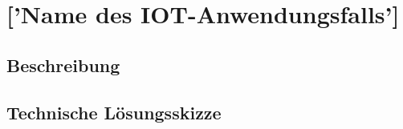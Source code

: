 \chapter{['Name des IOT-Anwendungsfalls']}
\label{ch:iot_usecase}
\lipsum[1-1]

%
%
\section{Beschreibung}
\label{sec:iot_usecase:description}
\lipsum[1-1]

%
%
\section{Technische Lösungsskizze}
\label{sec:iot_usecase:solution}
\lipsum[1-1]
